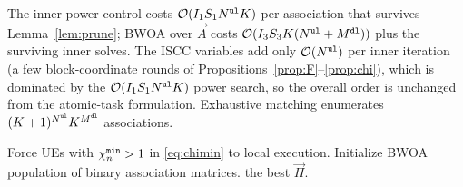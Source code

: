 \documentclass[journal]{IEEEtran}
\begin{document}
The {inner power control} costs $\mathcal{O}(I_1 S_1 N^{\tt ul}K)$ per association that survives Lemma~\ref{lem:prune}; 
BWOA over $\vec{A}$ costs $\mathcal{O}(I_3 S_3 K(N^{\tt ul}+M^{\tt dl}))$ plus the surviving inner solves. The ISCC variables add only $\mathcal{O}(N^{\tt ul})$ per inner iteration (a few block-coordinate rounds of Propositions~\ref{prop:F}--\ref{prop:chi}), which is dominated by the $\mathcal{O}(I_1 S_1 N^{\tt ul}K)$ power search, so the overall order is unchanged from the atomic-task formulation. Exhaustive matching enumerates $(K+1)^{N^{\tt ul}}K^{M^{\tt dl}}$ associations.

{\begin{algorithm}[!t]
\DontPrintSemicolon
{}
Force UEs with $\chi_n^{\tt min}>1$ in \eqref{eq:chimin} to local execution.\;
Initialize BWOA population of binary association matrices.\;
\Return the best $\vec{\Pi}$.\;
\caption{Hybrid {WOA/PSO/PGD}--BWOA for SI-TNTN UAV edge-inference ISCC.}
\label{alg:hyb}
\end{algorithm}
}
\end{document}
